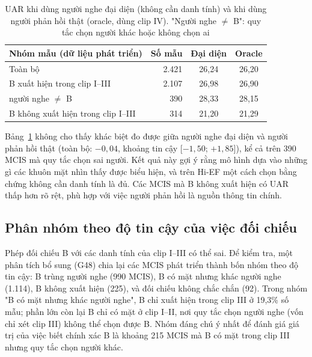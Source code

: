 \begin{table}[!htb]
\centering
\caption{UAR khi dùng người nghe đại diện (không cần danh tính) và khi dùng người phản hồi thật (oracle, dùng clip IV). "Người nghe $\neq$ B": quy tắc chọn người khác hoặc không chọn ai}
\label{tab:proxy}
\begin{tabular}{lrcc}
\toprule
Nhóm mẫu (dữ liệu phát triển) & Số mẫu & Đại diện & Oracle \\
\midrule
Toàn bộ & 2.421 & 26,24 & 26,20 \\
B xuất hiện trong clip I--III & 2.107 & 26,98 & 26,90 \\
\quad người nghe $\neq$ B & 390 & 28,33 & 28,15 \\
B không xuất hiện trong clip I--III & 314 & 21,20 & 21,29 \\
\bottomrule
\end{tabular}
\end{table}

Bảng~\ref{tab:proxy} không cho thấy khác biệt đo được giữa người nghe đại diện và người phản hồi thật (toàn bộ: $-0{,}04$, khoảng tin cậy [$-1{,}50$; $+1{,}85$]), kể cả trên 390 MCIS mà quy tắc chọn sai người. Kết quả này gợi ý rằng mô hình dựa vào những gì các khuôn mặt nhìn thấy được biểu hiện, và trên Hi-EF một cách chọn bằng chứng không cần danh tính là đủ. Các MCIS mà B không xuất hiện có UAR thấp hơn rõ rệt, phù hợp với việc người phản hồi là nguồn thông tin chính.

\subsection{Phân nhóm theo độ tin cậy của việc đối chiếu}

Phép đối chiếu B với các danh tính của clip I--III có thể sai. Để kiểm tra, một phân tích bổ sung (G48) chia lại các MCIS phát triển thành bốn nhóm theo độ tin cậy: B trùng người nghe (990 MCIS), B có mặt nhưng khác người nghe (1.114), B không xuất hiện (225), và đối chiếu không chắc chắn (92). Trong nhóm "B có mặt nhưng khác người nghe", B chỉ xuất hiện trong clip III ở 19,3\% số mẫu; phần lớn còn lại B chỉ có mặt ở clip I--II, nơi quy tắc chọn người nghe (vốn chỉ xét clip III) không thể chọn được B. Nhóm đáng chú ý nhất để đánh giá giá trị của việc biết chính xác B là khoảng 215 MCIS mà B có mặt trong clip III nhưng quy tắc chọn người khác.

